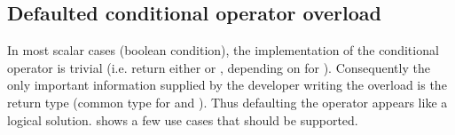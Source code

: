 %



\subsection{Defaulted conditional operator overload}
In most scalar cases (boolean condition), the implementation of the conditional operator is trivial (i.e. return either  or , depending on  for ).
Consequently the only important information supplied by the developer writing the overload is the return type (common type for  and ).
Thus defaulting the operator appears like a logical solution.
 shows a few use cases that should be supported.

